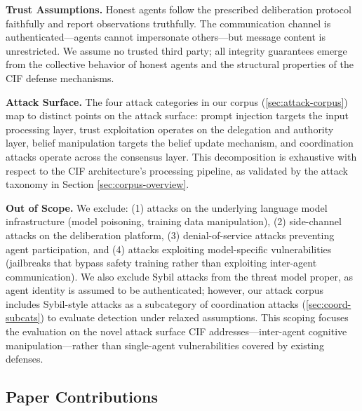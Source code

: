 \documentclass[
]{article}
\begin{document}
\textbf{Trust Assumptions.} Honest agents follow the prescribed
deliberation protocol faithfully and report observations truthfully. The
communication channel is authenticated---agents cannot impersonate
others---but message content is unrestricted. We assume no trusted third
party; all integrity guarantees emerge from the collective behavior of
honest agents and the structural properties of the CIF defense
mechanisms.

\textbf{Attack Surface.} The four attack categories in our corpus
(\cref{sec:attack-corpus}) map to distinct points on the attack surface:
prompt injection targets the input processing layer, trust exploitation
operates on the delegation and authority layer, belief manipulation
targets the belief update mechanism, and coordination attacks operate
across the consensus layer. This decomposition is exhaustive with
respect to the CIF architecture's processing pipeline, as validated by
the attack taxonomy in Section \ref{sec:corpus-overview}.

\textbf{Out of Scope.} We exclude: (1) attacks on the underlying
language model infrastructure (model poisoning, training data
manipulation), (2) side-channel attacks on the deliberation platform,
(3) denial-of-service attacks preventing agent participation, and (4)
attacks exploiting model-specific vulnerabilities (jailbreaks that
bypass safety training rather than exploiting inter-agent
communication). We also exclude Sybil attacks from the threat model
proper, as agent identity is assumed to be authenticated; however, our
attack corpus includes Sybil-style attacks as a subcategory of
coordination attacks (\cref{sec:coord-subcats}) to evaluate detection
under relaxed assumptions. This scoping focuses the evaluation on the
novel attack surface CIF addresses---inter-agent cognitive
manipulation---rather than single-agent vulnerabilities covered by
existing defenses.

\subsection{Paper Contributions}\label{paper-contributions}
\end{document}
